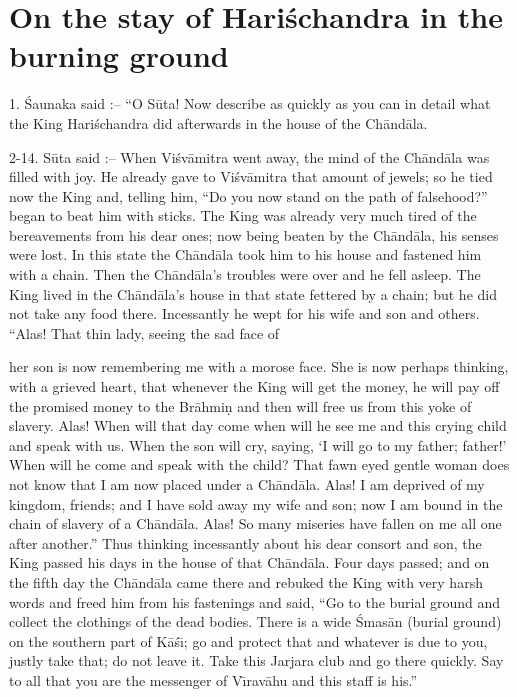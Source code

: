 \chapter{On the stay of Hari\'schandra in the burning ground}

1. \'Saunaka said :-- ``O S\=uta! Now describe as quickly as you can in detail what the King Hari\'schandra did afterwards in the house of the Ch\=and\=ala.

2-14. S\=uta said :-- When Vi\'sv\=amitra went away, the mind of the Ch\=and\=ala was filled with joy. He already gave to Vi\'sv\=amitra that amount of jewels; so he tied now the King and, telling him, ``Do you now stand on the path of falsehood?'' began to beat him with sticks. The King was already very much tired of the bereavements from his dear ones; now being beaten by the Ch\=and\=ala, his senses were lost. In this state the Ch\=and\=ala took him to his house and fastened him with a chain. Then the Ch\=and\=ala's troubles were over and he fell asleep. The King lived in the Ch\=and\=ala's house in that state fettered by a chain; but he did not take any food there. Incessantly he wept for his wife and son and others. ``Alas! That thin lady, seeing the sad face of

her son is now remembering me with a morose face. She is now perhaps thinking, with a grieved heart, that whenever the King will get the money, he will pay off the promised money to the Br\=ahmi\d{n} and then will free us from this yoke of slavery. Alas! When will that day come when will he see me and this crying child and speak with us. When the son will cry, saying, `I will go to my father; father!' When will he come and speak with the child? That fawn eyed gentle woman does not know that I am now placed under a Ch\=and\=ala. Alas! I am deprived of my kingdom, friends; and I have sold away my wife and son; now I am bound in the chain of slavery of a Ch\=and\=ala. Alas! So many miseries have fallen on me all one after another.'' Thus thinking incessantly about his dear consort and son, the King passed his days in the house of that Ch\=and\=ala. Four days passed; and on the fifth day the Ch\=and\=ala came there and rebuked the King with very harsh words and freed him from his fastenings and said, ``Go to the burial ground and collect the clothings of the dead bodies. There is a wide \'Smas\=an (burial ground) on the southern part of K\=a\'s\={\i}; go and protect that and whatever is due to you, justly take that; do not leave it. Take this Jarjara club and go there quickly. Say to all that you are the messenger of V\={\i}rav\=ahu and this staff is his.''

